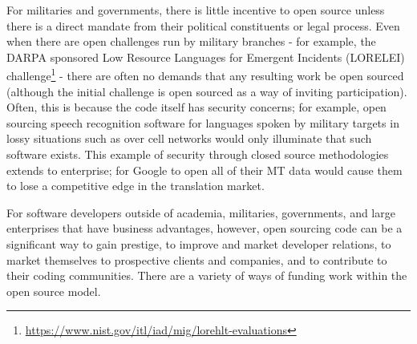 For militaries and governments, there is little incentive to open source unless there is a direct mandate from their political constituents or legal process. Even when there are open challenges run by military branches - for example, the DARPA sponsored Low Resource Languages for Emergent Incidents (LORELEI) challenge\footnote{\href{https://www.nist.gov/itl/iad/mig/lorehlt-evaluations}{https://www.nist.gov/itl/iad/mig/lorehlt-evaluations}} - there are often no demands that any resulting work be open sourced (although the initial challenge is open sourced as a way of inviting participation). Often, this is because the code itself has security concerns; for example, open sourcing speech recognition software for languages spoken by military targets in lossy situations such as over cell networks would only illuminate that such software exists. This example of security through closed source methodologies extends to enterprise; for Google to open all of their MT data would cause them to lose a competitive edge in the translation market.

For software developers outside of academia, militaries, governments, and large enterprises that have business advantages, however, open sourcing code can be a significant way to gain prestige, to improve and market developer relations, to market themselves to prospective clients and companies, and to contribute to their coding communities. There are a variety of ways of funding work within the open source model.

